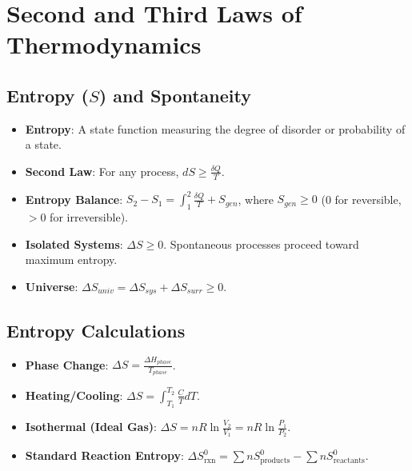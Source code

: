 \section{Second and Third Laws of Thermodynamics}

\subsection{Entropy ($S$) and Spontaneity}
\begin{itemize}
    \item \textbf{Entropy}: A state function measuring the degree of disorder or probability of a state.
    \item \textbf{Second Law}: For any process, $dS \geq \frac{\delta Q}{T}$.
    \item \textbf{Entropy Balance}: $S_2 - S_1 = \int_1^2 \frac{\delta Q}{T} + S_{gen}$, where $S_{gen} \geq 0$ (0 for reversible, $>0$ for irreversible).
    \item \textbf{Isolated Systems}: $\Delta S \geq 0$. Spontaneous processes proceed toward maximum entropy.
    \item \textbf{Universe}: $\Delta S_{univ} = \Delta S_{sys} + \Delta S_{surr} \geq 0$.
\end{itemize}

\subsection{Entropy Calculations}
\begin{itemize}
    \item \textbf{Phase Change}: $\Delta S = \frac{\Delta H_{phase}}{T_{phase}}$.
    \item \textbf{Heating/Cooling}: $\Delta S = \int_{T_1}^{T_2} \frac{C}{T} dT$.
    \item \textbf{Isothermal (Ideal Gas)}: $\Delta S = nR \ln \frac{V_2}{V_1} = nR \ln \frac{P_1}{P_2}$.
    \item \textbf{Standard Reaction Entropy}: $\Delta S^0_{\text{rxn}} = \sum n S^0_{\text{products}} - \sum n S^0_{\text{reactants}}$.
\end{itemize}

